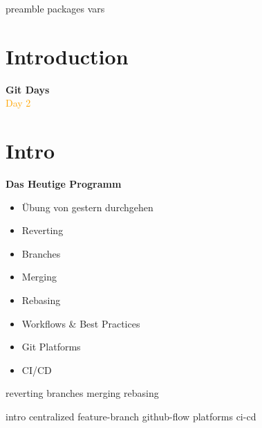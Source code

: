 \RequirePackage{import}
{preamble}
{packages}
{vars}


    \section{Introduction}\label{sec:introduction}

    \begin{frame}[c]
        \centering
        \Huge
        \textbf{Git Days}
        \\
        \vspace{1ex}
        \Large
        \textcolor{orange}{Day 2}
    \end{frame}

    \section{Intro}\label{sec:intro}
    \begin{frame}[c]
        \slidehead
        \vspace{-1em}
        \centering
        \large
        \textbf{Das Heutige Programm}
        \vspace{1em}
        \begin{itemize}[<+->]
            \item Übung von gestern durchgehen
            \item Reverting
            \item Branches
            \item Merging
            \item Rebasing
            \item Workflows \& Best Practices
            \item Git Platforms
            \item CI/CD
        \end{itemize}
    \end{frame}

    {reverting}
    {branches}
    {merging}
    {rebasing}

    {intro}
    {centralized}
    {feature-branch}
    {github-flow}
    {platforms}
    {ci-cd}

